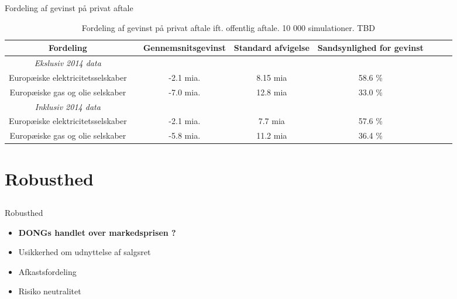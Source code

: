 \documentclass{beamer}
\newcommand\Fontvi{\fontsize{4}{7.2}\selectfont}
\begin{document}
\begin{frame}{Fordeling af gevinst på privat aftale}
\Fontvi

\begin{table}[h]
	\caption{Fordeling af gevinst på privat aftale ift. offentlig aftale. 10 000 simulationer. TBD}
	\label{tab:rel_fordeling}
	\begin{tabularx}{\linewidth}{cXcccccr}
	\toprule[1pt]
	Fordeling && Gennemsnitsgevinst & Standard afvigelse & Sandsynlighed for gevinst\\
	\hline 
	\emph{Ekslusiv 2014 data} \\
		Europæiske elektricitetsselskaber && -2.1 mia. & 8.15 mia & 58.6  \% \\
	Europæiske gas og olie selskaber && -7.0 mia. & 12.8 mia & 33.0  \% \\
	\emph{Inklusiv 2014 data} \\
		Europæiske elektricitetsselskaber && -2.1 mia. & 7.7 mia & 57.6  \% \\
	Europæiske gas og olie selskaber && -5.8 mia. & 11.2 mia & 36.4 \% \\
		\bottomrule[1pt]
	\end{tabularx}
	\begin{minipage}{\linewidth}
	\end{minipage}
\end{table}
\end{frame}

\section{Robusthed}
\subsection{}


\begin{frame}{Robusthed}

\begin{itemize}
	\item \textbf{DONGs handlet over markedsprisen ?}
	\item Usikkerhed om udnyttelse af salgsret
	\item Afkastsfordeling
	\item Risiko neutralitet
\end{itemize}

	
\end{frame}
\end{document}
